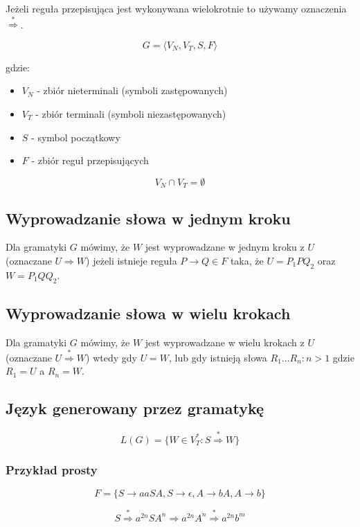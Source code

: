 \documentclass{../notatki}
\begin{document}
Jeżeli reguła przepisująca jest wykonywana wielokrotnie to używamy
oznaczenia $\stackrel{*}{\Rightarrow}$.

$$
G = \langle V_N, V_T, S, F \rangle
$$

gdzie:

\begin{itemize}
  \item $V_N$ - zbiór nieterminali (symboli zastępowanych)
  \item $V_T$ - zbiór terminali (symboli niezastępowanych)
  \item $S$ - symbol początkowy
  \item $F$ - zbiór reguł przepisujących
\end{itemize}

$$
V_N \cap V_T = \emptyset
$$

\subsection{Wyprowadzanie słowa w jednym kroku}

Dla gramatyki $G$ mówimy, że $W$ jest wyprowadzane w jednym kroku z
$U$ (oznaczane $U \Rightarrow W$) jeżeli istnieje reguła $P
\rightarrow Q \in F$ taka, że $U = P_1PQ_2$ oraz $W = P_1QQ_2$.

\subsection{Wyprowadzanie słowa w wielu krokach}

Dla gramatyki $G$ mówimy, że $W$ jest wyprowadzane w wielu krokach z
$U$ (oznaczane $U \stackrel{*}{\Rightarrow} W$) wtedy gdy $U=W$, lub
gdy istnieją słowa $R_1 \dots R_n : n > 1$ gdzie $R_1 = U$ a $R_n=W$.

\subsection{Język generowany przez gramatykę}

$$
L(G) = \{W \in V_T^* : S \stackrel{*}{\Rightarrow} W\}
$$

\subsubsection{Przykład prosty}

$$
F = \{S \rightarrow aaSA, S \rightarrow \epsilon, A \rightarrow bA, A
\rightarrow b \}
$$

$$
S \stackrel{*}{\Rightarrow} a^{2n}SA^n \Rightarrow a^{2n}A^n
\stackrel{*}{\Rightarrow} a^{2n}b^m
$$
\end{document}
